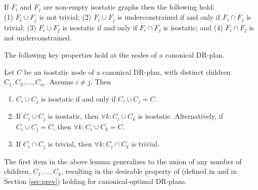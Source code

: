 \begin{observation*}\label{lemma:union_intersection}
If $F_i$ and $F_j$ are non-empty isostatic graphs then the following hold: \\
(1) $F_i\cup F_j$ is not trivial;
(2) $F_i\cup F_j$ is underconstrained if and only if $F_i\cap F_j$ is trivial;
(3) $F_i\cup F_j$ is isostatic if and only if $F_i\cap F_j$ is isostatic; and
(4) $F_i\cap F_j$ is not underconstrained.
\end{observation*}

The following key properties hold at the nodes of a canonical DR-plan.

\begin{lemma*}\label{lemma:combined_lemma}
Let $C$ be an isostatic node of a canonical DR-plan, with distinct children $C_1,C_2,\ldots, C_m$. Assume $i\ne j$.
Then
\begin{enumerate}
    \item\label{lemma:wc_intersection_is_C}
    $C_i\cup C_j$ is isostatic if and only if $C_i\cup C_j = C$.

    \item\label{lemma:wc_intersection_makes_all_wc}
    If $C_i\cup C_j$ is isostatic, then $\forall k: C_i\cup C_k$ is isostatic. Alternatively, if $C_i\cup C_j=C$, then $\forall k: C_i\cup C_k=C$.

    \item\label{lemma:uc_intersection_makes_all_uc}
    If $C_i\cap C_j$ is trivial, then $\forall k: C_i\cap C_k$ is trivial.
\end{enumerate}
\end{lemma*}

\begin{remark}
The first item in the above lemma generalizes to the union of any number of children, $C_1,\ldots,C_k$, resulting in the desirable property of  (defined in \cite{hoffman2001decompositionI} and in Section \ref{sec:prev}) holding for canonical-optimal DR-plans.
\end{remark}





%     
%     

